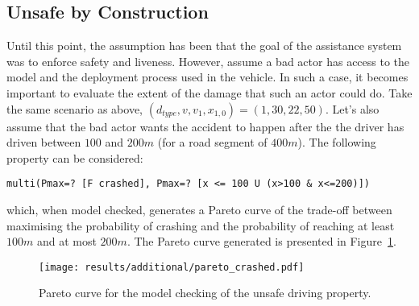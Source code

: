 %
%
%

\subsection{Unsafe by Construction}

Until this point, the assumption has been that the goal of the assistance system was to enforce safety and liveness. However, assume a bad actor has access to the model and the deployment process used in the vehicle. In such a case, it becomes important to evaluate the extent of the damage that such an actor could do. Take the same scenario as above, $(d_{type}, v, v_1, x_{1,0}) = (1, 30, 22, 50)$. Let's also assume that the bad actor wants the accident to happen after the the driver has driven between $100$ and $200m$ (for a road segment of $400m$). The following property can be considered:

\begin{minipage}{\linewidth}
{\vspace{1em}
\begin{lstlisting}
multi(Pmax=? [F crashed], Pmax=? [x <= 100 U (x>100 & x<=200)])
\end{lstlisting}
}
\end{minipage}

which, when model checked, generates a Pareto curve of the trade-off between maximising the probability of crashing and the probability of reaching at least $100m$ and at most $200m$. The Pareto curve generated is presented in Figure~\ref{fig:unsafe_pareto}.

\begin{figure}[H]
\centering
\texttt{[image: results/additional/pareto\_crashed.pdf]}
\caption{Pareto curve for the model checking of the unsafe driving property.}
\label{fig:unsafe_pareto}
\end{figure}

